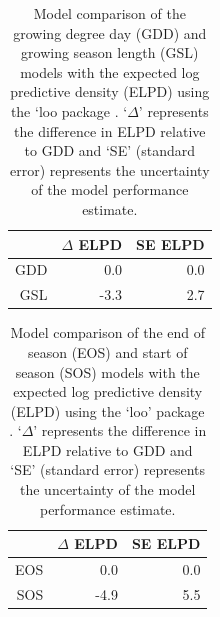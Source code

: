 \documentclass{article}\usepackage[]{graphicx}\usepackage[]{xcolor}
\begin{document}
\begin{table}[ht]
\centering
\begin{tabular}{rrr}
  \hline
 & $\Delta$ ELPD & SE ELPD \\ 
  \hline
GDD & 0.0 & 0.0 \\ 
  GSL & -3.3 & 2.7 \\ 
   \hline
\end{tabular}
\caption{Model comparison of the growing degree day (GDD) and growing season length (GSL) models with the expected log predictive density (ELPD) using the `loo package \citep{vehtari_practical_2017}. `$\Delta$' represents the difference in ELPD relative to GDD and `SE' (standard error) represents the uncertainty of the model performance estimate.} 
\label{tab:looGDDGSL}
\end{table}
\begin{table}[ht]
\centering
\begin{tabular}{rrr}
  \hline
 & $\Delta$ ELPD & SE ELPD \\ 
  \hline
EOS & 0.0 & 0.0 \\ 
  SOS & -4.9 & 5.5 \\ 
   \hline
\end{tabular}
\caption{Model comparison of the end of season (EOS) and start of season (SOS) models with the expected log predictive density (ELPD) using the `loo' package \citep{vehtari_practical_2017}. `$\Delta$' represents the difference in ELPD relative to GDD and `SE' (standard error) represents the uncertainty of the model performance estimate.} 
\label{tab:looSOSEOS}
\end{table}
\end{document}
